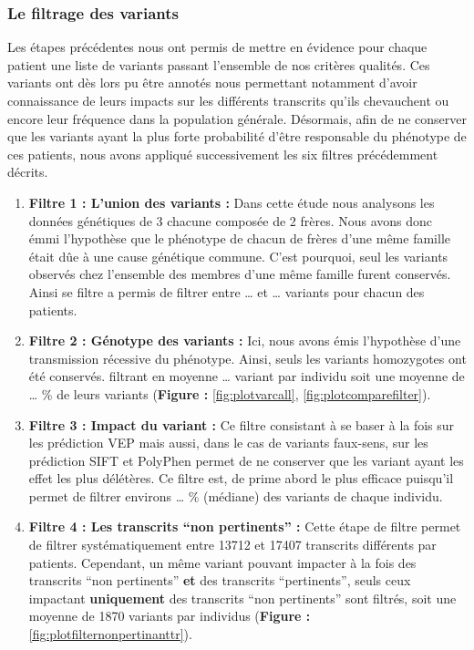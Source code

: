 \documentclass[12pt,twoside]{reedthesis}
\theoremstyle{definition}
\theoremstyle{definition}
\theoremstyle{remark}
\begin{document}
  \subsubsection{Le filtrage des
  variants}\label{le-filtrage-des-variants-1}
  
  Les étapes précédentes nous ont permis de mettre en évidence pour chaque
  patient une liste de variants passant l'ensemble de nos critères
  qualités. Ces variants ont dès lors pu être annotés nous permettant
  notamment d'avoir connaissance de leurs impacts sur les différents
  transcrits qu'ils chevauchent ou encore leur fréquence dans la
  population générale. Désormais, afin de ne conserver que les variants
  ayant la plus forte probabilité d'être responsable du phénotype de ces
  patients, nous avons appliqué successivement les six filtres
  précédemment décrits.
  
  \begin{enumerate}
  \def\labelenumi{\arabic{enumi}.}
  \item
    \textbf{Filtre 1 : L'union des variants :} Dans cette étude nous
    analysons les données génétiques de 3 chacune composée de 2 frères.
    Nous avons donc émmi l'hypothèse que le phénotype de chacun de frères
    d'une même famille était dûe à une cause génétique commune. C'est
    pourquoi, seul les variants observés chez l'ensemble des membres d'une
    même famille furent conservés. Ainsi se filtre a permis de filtrer
    entre \ldots{} et \ldots{} variants pour chacun des patients.
  \item
    \textbf{Filtre 2 : Génotype des variants :} Ici, nous avons émis
    l'hypothèse d'une transmission récessive du phénotype. Ainsi, seuls
    les variants homozygotes ont été conservés. filtrant en moyenne
    \ldots{} variant par individu soit une moyenne de \ldots{} \% de leurs
    variants (\textbf{Figure : }\ref{fig:plotvarcall},
    \ref{fig:plotcomparefilter}).
  \item
    \textbf{Filtre 3 : Impact du variant :} Ce filtre consistant à se
    baser à la fois sur les prédiction VEP mais aussi, dans le cas de
    variants faux-sens, sur les prédiction SIFT et PolyPhen permet de ne
    conserver que les variant ayant les effet les plus délétères. Ce
    filtre est, de prime abord le plus efficace puisqu'il permet de
    filtrer environs \ldots{} \% (médiane) des variants de chaque
    individu.
  \item
    \textbf{Filtre 4 : Les transcrits ``non pertinents'' :} Cette étape de
    filtre permet de filtrer systématiquement entre 13712 et 17407
    transcrits différents par patients. Cependant, un même variant pouvant
    impacter à la fois des transcrits ``non pertinents'' \textbf{et} des
    transcrits ``pertinents'', seuls ceux impactant \textbf{uniquement}
    des transcrits ``non pertinents'' sont filtrés, soit une moyenne de
    1870 variants par individus (\textbf{Figure :
    }\ref{fig:plotfilternonpertinanttr}).
  \end{enumerate}
  
\end{document}
